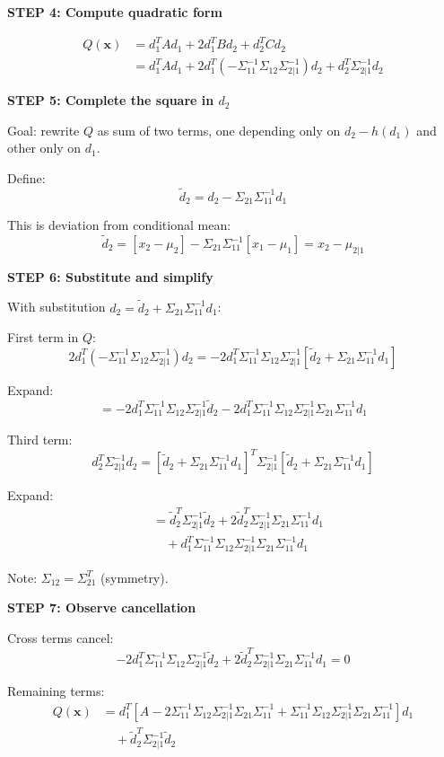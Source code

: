 \documentclass[12pt]{article}
\begin{document}
\begin{solution}
\textbf{STEP 4: Compute quadratic form}

\begin{align*}
Q(\mathbf{x}) &= d_1^T A d_1 + 2d_1^T B d_2 + d_2^T C d_2 \\
&= d_1^T A d_1 + 2d_1^T(-\Sigma_{11}^{-1}\Sigma_{12}\Sigma_{2|1}^{-1})d_2 + d_2^T\Sigma_{2|1}^{-1}d_2
\end{align*}

\textbf{STEP 5: Complete the square in $d_2$}

Goal: rewrite $Q$ as sum of two terms, one depending only on $d_2 - h(d_1)$ and other only on $d_1$.

Define:
\[
\tilde{d}_2 = d_2 - \Sigma_{21}\Sigma_{11}^{-1}d_1
\]

This is deviation from conditional mean:
\[
\tilde{d}_2 = [x_2 - \mu_2] - \Sigma_{21}\Sigma_{11}^{-1}[x_1 - \mu_1] = x_2 - \mu_{2|1}
\]

\textbf{STEP 6: Substitute and simplify}

With substitution $d_2 = \tilde{d}_2 + \Sigma_{21}\Sigma_{11}^{-1}d_1$:

First term in $Q$:
\[
2d_1^T(-\Sigma_{11}^{-1}\Sigma_{12}\Sigma_{2|1}^{-1})d_2 = -2d_1^T\Sigma_{11}^{-1}\Sigma_{12}\Sigma_{2|1}^{-1}[\tilde{d}_2 + \Sigma_{21}\Sigma_{11}^{-1}d_1]
\]

Expand:
\[
= -2d_1^T\Sigma_{11}^{-1}\Sigma_{12}\Sigma_{2|1}^{-1}\tilde{d}_2 - 2d_1^T\Sigma_{11}^{-1}\Sigma_{12}\Sigma_{2|1}^{-1}\Sigma_{21}\Sigma_{11}^{-1}d_1
\]

Third term:
\[
d_2^T\Sigma_{2|1}^{-1}d_2 = [\tilde{d}_2 + \Sigma_{21}\Sigma_{11}^{-1}d_1]^T\Sigma_{2|1}^{-1}[\tilde{d}_2 + \Sigma_{21}\Sigma_{11}^{-1}d_1]
\]

Expand:
\begin{align*}
&= \tilde{d}_2^T\Sigma_{2|1}^{-1}\tilde{d}_2 + 2\tilde{d}_2^T\Sigma_{2|1}^{-1}\Sigma_{21}\Sigma_{11}^{-1}d_1 \\
&\quad + d_1^T\Sigma_{11}^{-1}\Sigma_{12}\Sigma_{2|1}^{-1}\Sigma_{21}\Sigma_{11}^{-1}d_1
\end{align*}

Note: $\Sigma_{12} = \Sigma_{21}^T$ (symmetry).

\textbf{STEP 7: Observe cancellation}

Cross terms cancel:
\[
-2d_1^T\Sigma_{11}^{-1}\Sigma_{12}\Sigma_{2|1}^{-1}\tilde{d}_2 + 2\tilde{d}_2^T\Sigma_{2|1}^{-1}\Sigma_{21}\Sigma_{11}^{-1}d_1 = 0
\]

Remaining terms:
\begin{align*}
Q(\mathbf{x}) &= d_1^T\left[A - 2\Sigma_{11}^{-1}\Sigma_{12}\Sigma_{2|1}^{-1}\Sigma_{21}\Sigma_{11}^{-1} + \Sigma_{11}^{-1}\Sigma_{12}\Sigma_{2|1}^{-1}\Sigma_{21}\Sigma_{11}^{-1}\right]d_1 \\
&\quad + \tilde{d}_2^T\Sigma_{2|1}^{-1}\tilde{d}_2
\end{align*}


\end{solution}
\end{document}
